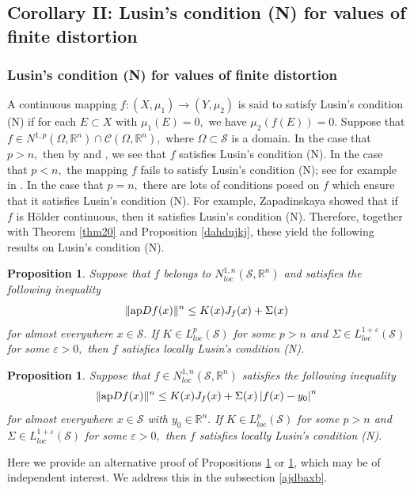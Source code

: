 \documentclass[11pt,twoside]{article}
\newtheorem{prop}[thm]{Proposition}
\theoremstyle{definition}
\theoremstyle{remark}
\newcommand{\abs}[1]{\left|#1\right|}
\begin{document}
\subsection{Corollary II:  Lusin's condition (N) for values of finite distortion}
 \subsubsection{Lusin's condition (N) for values of finite distortion}
A continuous mapping $f:(X,\mu_{1})\rightarrow(Y,\mu_{2})$ is said to satisfy Lusin's condition (N) if  for each $E\subset X$ with $\mu_{1}(E)=0,$ we have $\mu_{2}(f(E))=0.$ 
Suppose that $f\in N^{1,p}(\Omega,\mathbb{R}^{n})\cap \mathcal{C}(\Omega,\mathbb{R}^{n}),$ where $\Omega\subset\mathcal{S}$ is a domain. In the case that $p>n,$ then by \cite[Theorem 6.1]{HKST01} and \cite[Theorem 1]{Zap14}, we see that $f$ satisfies Lusin's condition (N). In the case that $p<n,$ the mapping $f$ fails to satisfy Lusin's condition (N); see for example in \cite{Pon71}. In the case that 
$p=n,$ there are lots of conditions posed on $f$ which ensure that it satisfies Lusin's condition (N). For example, Zapadinskaya \cite[Theorem 1]{Zap14} showed  that if $f$ is H\"{o}lder continuous, then it satisfies Lusin's condition (N). Therefore, together with Theorem \ref{thm20} and Proposition \ref{dahdujkj}, these yield the following results on Lusin's condition (N).
\begin{prop}\label{porhdjxja}
Suppose that $f$ belongs to  $N_{loc}^{1,n}(\mathcal{S},\mathbb{R}^{n})$ and satisfies the following inequality
\begin{equation}
\| {\rm ap}Df(x)\|^{n}\leq K(x)J_{f}(x)+\Sigma(x)
\end{equation}
for almost everywhere $x\in\mathcal{S}.$ If $K\in L_{loc}^{p}(\mathcal{S})$ for some $p>n$ and  $\Sigma\in L_{loc}^{1+\varepsilon}(\mathcal{S})$ for some $\varepsilon>0,$ then $f$ satisfies locally Lusin's 
condition (N).
\end{prop}
\begin{prop}\label{dahdujkjdfvs} 
Suppose that $f\in N_{loc}^{1,n}(\mathcal{S},\mathbb{R}^{n})$  satisfies the following inequality
\begin{equation}
\| {\rm ap}Df(x)\|^{n}\leq K(x)J_{f}(x)+\Sigma(x)\abs{f(x)-y_{0}}^{n}
\end{equation}
for almost everywhere $x\in\mathcal{S}$ with $y_{0}\in\mathbb{R}^{n}.$ If $K\in L_{loc}^{p}(\mathcal{S})$ for some $p>n$ and  $\Sigma\in L_{loc}^{1+\varepsilon}(\mathcal{S})$ for some $\varepsilon>0,$ then $f$ satisfies locally Lusin's 
condition (N).
\end{prop}
Here we provide an alternative proof of Propositions \ref{porhdjxja} or \ref{dahdujkjdfvs}, which may be of independent interest. We address this in the subsection \ref{ajdbaxb}.
\end{document}
